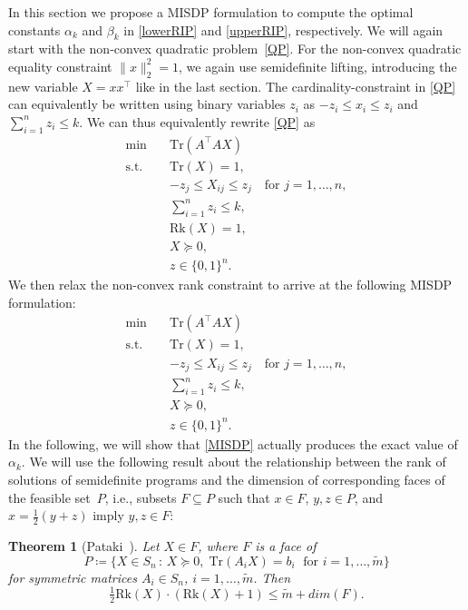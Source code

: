 \documentclass[journal]{IEEEtran}
\newtheorem{theorem}{Theorem}
\newcommand{\suchthat}{\,:\,}
\newcommand{\define}{\coloneqq}
\newcommand{\Norm}[2]{\lVert{#1}\rVert_{#2}}
\newcommand{\T}{^{\top}}
\newcommand{\Tr}{\text{Tr}}
\newcommand{\Rk}{\text{Rk}}
\begin{document}
\noindent
In this section we propose a MISDP formulation to compute the optimal
constants $\alpha_k$ and $\beta_k$ in \eqref{lowerRIP} and
\eqref{upperRIP}, respectively. We will again start with the non-convex quadratic problem~\eqref{QP}.
For the non-convex quadratic equality constraint $\Norm{x}{2}^2 = 1$, we
again use semidefinite lifting, introducing the new variable $X=xx\T$ like in the last section. 
The cardinality-constraint in \eqref{QP} can equivalently be written using
binary variables $z_i$ as $-z_i \leq x_i \leq z_i$ and $\sum_{i=1}^n z_i
\leq k$. We can thus equivalently rewrite \eqref{QP} as
\begin{align}\label{Rk1MISDP}
 \min \quad & \Tr(A\T A X) \nonumber \\
 \text{s.t.} \quad & \Tr(X) = 1, \nonumber \\
 & -z_j \leq X_{ij} \leq z_j \quad \text{for } j = 1, \dots, n, \nonumber \\
 & \sum_{i=1}^n z_i \leq k,\tag{Rk1MISDP}\\
 & \Rk(X) = 1, \nonumber \\
 & X \succeq 0,  \nonumber \\
 & z \in \{0,1\}^n. \nonumber
\end{align}
We then relax the non-convex rank constraint to arrive at the following
MISDP formulation:
\begin{align}\label{MISDP}
 \min \quad & \Tr(A\T A X) \nonumber \\
 \text{s.t.} \quad & \Tr(X) = 1, \nonumber \\
 & -z_j \leq X_{ij} \leq z_j \quad \text{for } j = 1, \dots, n, \nonumber \\
 & \sum_{i=1}^n z_i \leq k, \tag{MISDP} \\
 & X \succeq 0,  \nonumber \\
 & z \in \{0,1\}^n. \nonumber
\end{align}
In the following, we will show that \eqref{MISDP} actually produces the
exact value of $\alpha_k$. We will use the following result about the
relationship between the rank of solutions of semidefinite programs and the
dimension of corresponding faces of the feasible set~$P$, i.e., subsets $F
\subseteq P$ such that $x \in F$, $y, z \in P$, and $x = \tfrac{1}{2} (y + z)$ imply
$y,z \in F$:

\begin{theorem}[Pataki~\cite{pat98}]\label{patakiLemma}
  Let $X \in F$, where $F$ is a face of
  \begin{equation*}
    P \define \{X \in S_n \suchthat X \succeq 0,\; \Tr(A_i X) = b_i\; \text{ for } i = 1, \dots, \tilde{m}\}
  \end{equation*}
  for symmetric matrices $A_i \in S_n$, $i = 1, \dots, \tilde{m}$. Then
  \begin{equation*}
    \tfrac{1}{2}\Rk(X)\cdot(\Rk(X)+1) \leq \tilde{m} + dim(F).
  \end{equation*}
\end{theorem}
\end{document}
